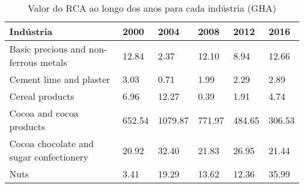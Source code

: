 \begin{table}
\centering
\caption{Valor do RCA ao longo dos anos para cada indústria (GHA)}
\begin{tabular}{p{6cm}p{1.5cm}p{1.5cm}p{1.5cm}p{1.5cm}p{1.5cm}}
\toprule
                              Indústria &   2000 &    2004 &   2008 &   2012 &   2016 \\
\midrule
  Basic precious and non-ferrous metals &  12.84 &    2.37 &  12.10 &   8.94 &  12.66 \\
                Cement lime and plaster &   3.03 &    0.71 &   1.99 &   2.29 &   2.89 \\
                        Cereal products &   6.96 &   12.27 &   0.39 &   1.91 &   4.74 \\
               Cocoa and cocoa products & 652.54 & 1079.87 & 771.97 & 484.65 & 306.53 \\
Cocoa chocolate and sugar confectionery &  20.92 &   32.40 &  21.83 &  26.95 &  21.44 \\
                                   Nuts &   3.41 &   19.29 &  13.62 &  12.36 &  35.99 \\
\bottomrule
\end{tabular}
\end{table}
